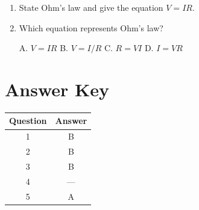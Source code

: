 \begin{enumerate}[label=\textbf{\arabic*.}]
\item State Ohm's law and give the equation $V = IR$.

\item Which equation represents Ohm's law?

A. $V = IR$
B. $V = I/R$
C. $R = VI$
D. $I = VR$

\end{enumerate}

\newpage

\section*{Answer Key}

\begin{tabular}{|c|c|}
\hline
\textbf{Question} & \textbf{Answer} \\
\hline
1 & B \\
\hline
2 & B \\
\hline
3 & B \\
\hline
4 & --- \\
\hline
5 & A \\
\hline
\end{tabular}
